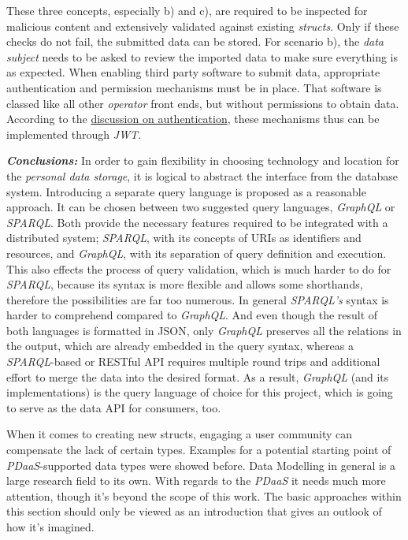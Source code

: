 \documentclass[12pt,english,a4paper,titlepage,cleardoublepage=empty,dottedtoc]{report}
\begin{document}
These three concepts, especially b) and c), are required to be inspected
for malicious content and extensively validated against existing
\emph{structs}. Only if these checks do not fail, the submitted data can
be stored. For scenario b), the \emph{data subject} needs to be asked to
review the imported data to make sure everything is as expected. When
enabling third party software to submit data, appropriate authentication
and permission mechanisms must be in place. That software is classed
like all other \emph{operator} front ends, but without permissions to
obtain data. According to the
\protect\hyperlink{authentication}{discussion on authentication}, these
mechanisms thus can be implemented through \emph{JWT}.

\emph{\textbf{Conclusions:}} In order to gain flexibility in choosing
technology and location for the \emph{personal data storage}, it is
logical to abstract the interface from the database system. Introducing
a separate query language is proposed as a reasonable approach. It can
be chosen between two suggested query languages, \emph{GraphQL} or
\emph{SPARQL}. Both provide the necessary features required to be
integrated with a distributed system; \emph{SPARQL}, with its concepts
of URIs as identifiers and resources, and \emph{GraphQL}, with its
separation of query definition and execution. This also effects the
process of query validation, which is much harder to do for
\emph{SPARQL}, because its syntax is more flexible and allows some
shorthands, therefore the possibilities are far too numerous. In general
\emph{SPARQL's} syntax is harder to comprehend compared to
\emph{GraphQL}. And even though the result of both languages is
formatted in JSON, only \emph{GraphQL} preserves all the relations in
the output, which are already embedded in the query syntax, whereas a
\emph{SPARQL}-based or RESTful API requires multiple round trips and
additional effort to merge the data into the desired format. As a
result, \emph{GraphQL} (and its implementations) is the query language
of choice for this project, which is going to serve as the data API for
consumers, too.

When it comes to creating new structs, engaging a user community can
compensate the lack of certain types. Examples for a potential starting
point of \emph{PDaaS}-supported data types were showed before. Data
Modelling in general is a large research field to its own. With regards
to the \emph{PDaaS} it needs much more attention, though it's beyond the
scope of this work. The basic approaches within this section should only
be viewed as an introduction that gives an outlook of how it's imagined.
\end{document}

